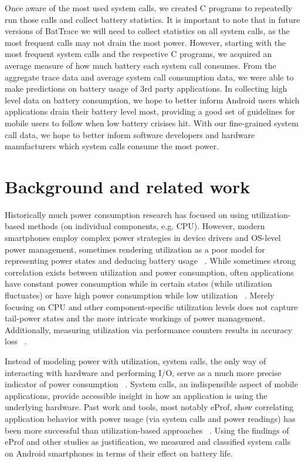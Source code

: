 \documentclass[11pt]{article}
\begin{document}
Once aware of the most used system calls, we created C programs to repeatedly run those calls and
collect battery statistics.  It is important to note that in future versions of BatTrace we will need to collect
statistics on all system calls, as the most frequent calls may not drain the most power.  However, starting with the 
most frequent system calls and the respective C programs, we acquired an average measure of how much battery each system call 
consumes.  From the aggregate trace data and average system call consumption data, we were 
able to make predictions on battery usage of 3rd party applications.  In collecting high level 
data on battery consumption, we hope to better inform Android users which applications drain their 
battery level most, providing a good set of guidelines for mobile users to follow when low battery 
crisises hit.  With our fine-grained system call data, we hope to better inform software developers 
and hardware manufacturers which system calls consume the most power.   

\section{Background and related work}

Historically much power consumption research has focused on using utilization-based
methods (on individual components, e.g. CPU).  However, modern smartphones employ complex 
power strategies in device drivers and OS-level power management, sometimes rendering utilization as a poor 
model for representing power states and deducing battery usage ~\cite{pathak-systemcall}.  While 
sometimes strong correlation exists between utilization and power consumption, often 
applications have constant power consumption while in certain states (while 
utilization fluctuates) or have high power consumption while low utilization ~\cite{pathak-systemcall,google-androiddev}.  
Merely focusing on CPU and other component-specific 
utilization levels does not capture tail-power states and the more intricate workings of power management.
Additionally, measuring utilization via performance counters results in accuracy 
loss ~\cite{pathak-systemcall}.  

Instead of modeling power with utilization, system calls, the only way of 
interacting with hardware and performing I/O, serve as a much more precise indicator 
of power consumption ~\cite{pathak-systemcall}.  System calls, an indispensible aspect of mobile applications, 
provide accessible insight in how an application is using the underlying hardware.  Past work and tools, most 
notably eProf, show correlating application behavior with power usage (via system calls and power readings) has 
been more successful than utilization-based approaches ~\cite{pathak-systemcall,yoon-appscope,pathak-eprof,ding-signals}.  
Using the findings of eProf and other studies as justification, we measured and classified system 
calls on Android smartphones in terms of their effect on battery life.
\end{document}
